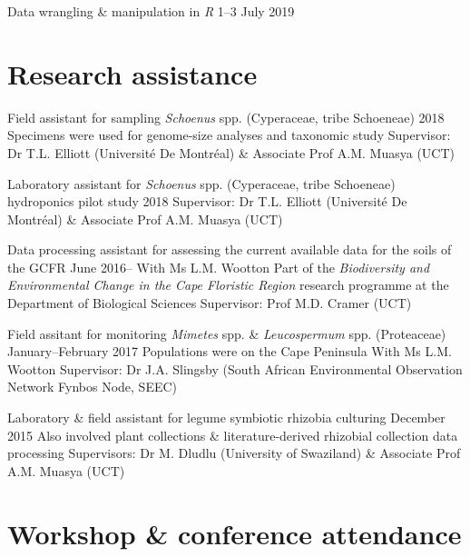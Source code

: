 \documentclass[10pt]{article}
\begin{document}
Data wrangling \& manipulation in \textit{R}      \hfill 1--3 July 2019

\section*{Research assistance} %

\begin{hangparas}{2em}{1}

Field assistant for sampling \textit{Schoenus} spp. (Cyperaceae, tribe 
Schoeneae)                                           \hfill 2018 \break
Specimens were used for genome-size analyses and taxonomic study \break
Supervisor: Dr T.L. Elliott (Université De Montréal) \& Associate Prof A.M. 
Muasya (UCT)

Laboratory assistant for \textit{Schoenus} spp. (Cyperaceae, tribe Schoeneae) 
hydroponics pilot study                              \hfill 2018 \break
Supervisor: Dr T.L. Elliott (Université De Montréal) \& Associate Prof A.M. 
Muasya (UCT)

Data processing assistant for assessing the current available data for the 
soils of the GCFR                             \hfill June 2016-- \break
With Ms L.M. Wootton \break
Part of the \textit{Biodiversity and Environmental Change in the Cape Floristic 
Region} research programme at the Department of Biological Sciences \break
Supervisor: Prof M.D. Cramer (UCT)

Field assitant for monitoring \textit{Mimetes} spp. \& \textit{Leucospermum} 
spp. (Proteaceae)                  \hfill January--February 2017 \break
Populations were on the Cape Peninsula \break
With Ms L.M. Wootton \break
Supervisor: Dr J.A. Slingsby (South African Environmental Observation Network 
Fynbos Node, SEEC)

Laboratory \& field assistant for legume symbiotic rhizobia culturing
                                            \hfill December 2015 \break
Also involved plant collections \& literature-derived rhizobial collection 
data processing \break
Supervisors: Dr M. Dludlu (University of Swaziland) \& Associate Prof A.M. 
Muasya (UCT)


\hfill

\end{hangparas}

\section*{Workshop \& conference attendance} %
\end{document}
